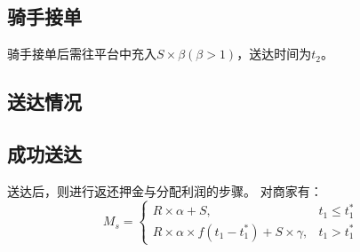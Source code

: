 \documentclass[UTF8]{ctexart}
\begin{document}
\begin{multicols}{2}
  \subsection{骑手接单}
     骑手接单后需往平台中充入$S×\beta(\beta>1)$，送达时间为$t_2$。
  \subsection{送达情况}
  \subsection{成功送达}
    送达后，则进行返还押金与分配利润的步骤。
    对商家有：
    $$
    M_s=\left\{
      \begin{array}{lr}
        R \times \alpha + S,  & {t_1 \leq t_1^{*}}\\
        R \times \alpha \times f(t_1-t_1^{*}) + S \times \gamma, & {t_1 > t_1^{*}}
      \end{array}\right.
    $$
    


\end{multicols}




\end{document}
